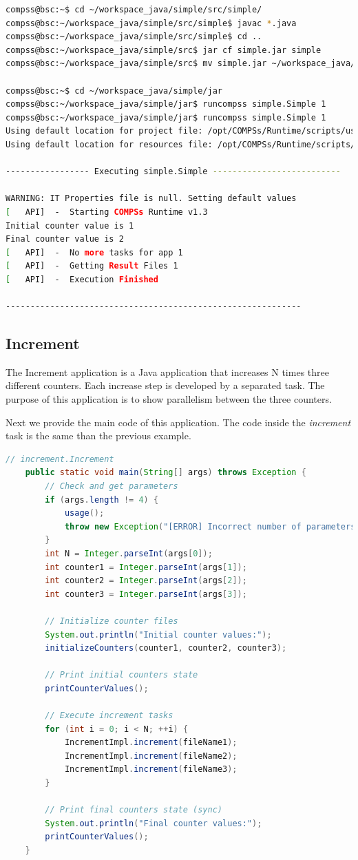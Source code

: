 \begin{lstlisting}[language=bash]
compss@bsc:~$ cd ~/workspace_java/simple/src/simple/
compss@bsc:~/workspace_java/simple/src/simple$ javac *.java
compss@bsc:~/workspace_java/simple/src/simple$ cd ..
compss@bsc:~/workspace_java/simple/src$ jar cf simple.jar simple
compss@bsc:~/workspace_java/simple/src$ mv simple.jar ~/workspace_java/simple/jar/

compss@bsc:~$ cd ~/workspace_java/simple/jar
compss@bsc:~/workspace_java/simple/jar$ runcompss simple.Simple 1
compss@bsc:~/workspace_java/simple/jar$ runcompss simple.Simple 1
Using default location for project file: /opt/COMPSs/Runtime/scripts/user/../../configuration/xml/projects/project.xml
Using default location for resources file: /opt/COMPSs/Runtime/scripts/user/../../configuration/xml/resources/resources.xml

----------------- Executing simple.Simple --------------------------

WARNING: IT Properties file is null. Setting default values
[   API]  -  Starting COMPSs Runtime v1.3
Initial counter value is 1
Final counter value is 2
[   API]  -  No more tasks for app 1
[   API]  -  Getting Result Files 1
[   API]  -  Execution Finished

------------------------------------------------------------
\end{lstlisting}


\subsection{Increment}
The Increment application is a Java application that increases N times three different counters. Each increase step is developed by a separated task. The
purpose of this application is to show parallelism between the three counters.

Next we provide the main code of this application. The code inside the \textit{increment} task is the same than the previous example. 

\begin{lstlisting}[language=java]
	// increment.Increment
	public static void main(String[] args) throws Exception {
		// Check and get parameters
		if (args.length != 4) {
			usage();
			throw new Exception("[ERROR] Incorrect number of parameters");
		}
		int N = Integer.parseInt(args[0]);
		int counter1 = Integer.parseInt(args[1]);
		int counter2 = Integer.parseInt(args[2]);
		int counter3 = Integer.parseInt(args[3]);
		
		// Initialize counter files
		System.out.println("Initial counter values:");
		initializeCounters(counter1, counter2, counter3);
		
		// Print initial counters state
		printCounterValues();

		// Execute increment tasks
		for (int i = 0; i < N; ++i) {
			IncrementImpl.increment(fileName1);
			IncrementImpl.increment(fileName2);
			IncrementImpl.increment(fileName3);
		}

		// Print final counters state (sync)
		System.out.println("Final counter values:");
		printCounterValues();
	}
\end{lstlisting}

